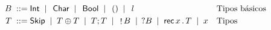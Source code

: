   \begin{align*}
    B \; ::= \; & \mathsf{Int} \;\mid\; \, \mathsf{Char} \;\mid\; \, \mathsf{Bool} \;\mid\; \, ()  \;\mid\; \, l && \text{Tipos básicos}\\
    T \; ::= \;       & \mathsf{Skip} \;\mid\; T \oplus T \;\mid\; T;T  \;\mid\; \,\mathop!B \;\mid\; \,?B \;\mid\; \mathsf{rec}\,x\,.\,T \;\mid\; x && \text{Tipos} 
  \end{align*}


